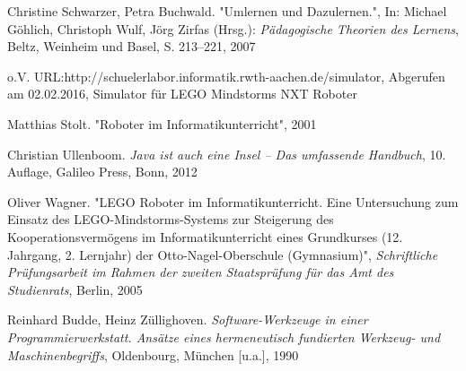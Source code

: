 \begin{thebibliography}{ABCDEF}
Christine Schwarzer, Petra Buchwald. "{Umlernen und Dazulernen}.", In: Michael Göhlich, Christoph Wulf, Jörg Zirfas (Hrsg.): \emph{Pädagogische Theorien des Lernens}, Beltz, Weinheim und Basel,  S. 213--221, 2007


o.V. URL:{http://schuelerlabor.informatik.rwth-aachen.de/simulator}, Abgerufen am 02.02.2016, Simulator für LEGO Mindstorms NXT Roboter

Matthias Stolt. "Roboter im Informatikunterricht", 2001

Christian Ullenboom. \emph{Java ist auch eine Insel -- Das umfassende Handbuch}, 10. Auflage, Galileo Press, Bonn, 2012

Oliver Wagner. "LEGO Roboter im Informatikunterricht. Eine Untersuchung zum Einsatz des LEGO-Mindstorms-Systems zur Steigerung des Kooperationsvermögens im Informatikunterricht eines Grundkurses (12. Jahrgang, 2. Lernjahr) der Otto-Nagel-Oberschule (Gymnasium)", \emph{Schriftliche Prüfungsarbeit im Rahmen der zweiten Staatsprüfung für das Amt des Studienrats}, Berlin, 2005

Reinhard Budde, Heinz Züllighoven. \emph{Software-Werkzeuge in einer Programmierwerkstatt. Ansätze eines hermeneutisch fundierten Werkzeug- und Maschinenbegriffs}, Oldenbourg, München [u.a.], 1990
\end{thebibliography}